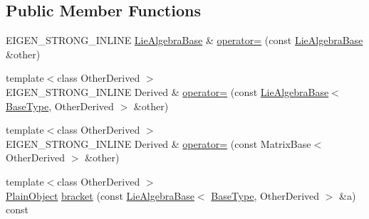 \subsection*{Public Member Functions}
\begin{DoxyCompactItemize}
\item 
E\+I\+G\+E\+N\+\_\+\+S\+T\+R\+O\+N\+G\+\_\+\+I\+N\+L\+I\+NE \hyperlink{class_lie_algebra_base}{Lie\+Algebra\+Base} \& \hyperlink{class_lie_algebra_base_3_01_matrix_3_01typename_01internal_1_1traits_3_01_derived_01_4_1_1_scalabfa0bdce6d9781ee940346c3f6d91f4e_aa1e456962c1fc5198a19c438f6dfca4a}{operator=} (const \hyperlink{class_lie_algebra_base}{Lie\+Algebra\+Base} \&other)
\item 
{\footnotesize template$<$class Other\+Derived $>$ }\\E\+I\+G\+E\+N\+\_\+\+S\+T\+R\+O\+N\+G\+\_\+\+I\+N\+L\+I\+NE Derived \& \hyperlink{class_lie_algebra_base_3_01_matrix_3_01typename_01internal_1_1traits_3_01_derived_01_4_1_1_scalabfa0bdce6d9781ee940346c3f6d91f4e_a04876d813c2cd5c25150f4028ba048ca}{operator=} (const \hyperlink{class_lie_algebra_base}{Lie\+Algebra\+Base}$<$ \hyperlink{class_lie_algebra_base_3_01_matrix_3_01typename_01internal_1_1traits_3_01_derived_01_4_1_1_scalabfa0bdce6d9781ee940346c3f6d91f4e_a2191d421225a2c966825db324301abba}{Base\+Type}, Other\+Derived $>$ \&other)
\item 
{\footnotesize template$<$class Other\+Derived $>$ }\\E\+I\+G\+E\+N\+\_\+\+S\+T\+R\+O\+N\+G\+\_\+\+I\+N\+L\+I\+NE Derived \& \hyperlink{class_lie_algebra_base_3_01_matrix_3_01typename_01internal_1_1traits_3_01_derived_01_4_1_1_scalabfa0bdce6d9781ee940346c3f6d91f4e_a91c3f4ab0fef7eddac375d0909f47bf2}{operator=} (const Matrix\+Base$<$ Other\+Derived $>$ \&other)
\item 
{\footnotesize template$<$class Other\+Derived $>$ }\\\hyperlink{class_lie_algebra_base_3_01_matrix_3_01typename_01internal_1_1traits_3_01_derived_01_4_1_1_scalabfa0bdce6d9781ee940346c3f6d91f4e_a94a8de5117cf8e3142a6ceab24c1f5c2}{Plain\+Object} \hyperlink{class_lie_algebra_base_3_01_matrix_3_01typename_01internal_1_1traits_3_01_derived_01_4_1_1_scalabfa0bdce6d9781ee940346c3f6d91f4e_afa135aa64acf6e927c6104b1fa8ce4bf}{bracket} (const \hyperlink{class_lie_algebra_base}{Lie\+Algebra\+Base}$<$ \hyperlink{class_lie_algebra_base_3_01_matrix_3_01typename_01internal_1_1traits_3_01_derived_01_4_1_1_scalabfa0bdce6d9781ee940346c3f6d91f4e_a2191d421225a2c966825db324301abba}{Base\+Type}, Other\+Derived $>$ \&a) const

\end{DoxyCompactItemize}
